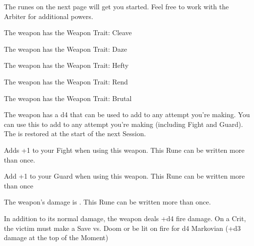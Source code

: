 {{  


}
 
The runes on the next page will get you started.  Feel free to work with the Arbiter for additional powers.  

\newpage




The weapon has the Weapon Trait: Cleave


The weapon has the Weapon Trait: Daze


The weapon has the Weapon Trait: Hefty


The weapon has the Weapon Trait: Rend


The weapon has the Weapon Trait: Brutal


The weapon has a d4 \UD that can be used to add to any \RO attempt you're making. You can use this \UD to add to any \RO attempt you're making (including Fight and Guard).  The \UD is restored at the start of the next Session.





Adds +1 to your Fight \RO when using this weapon.  This Rune can be written more than once.



Add +1 to your Guard \RO when using this weapon.  This Rune can be written more than once



The weapon's damage is \DCUP.  This Rune can be written more than once.



In addition to its normal damage, the weapon deals +d4 fire damage.  On a Crit, the victim must make a Save vs. Doom or be lit on fire for d4 Markovian (+d3 damage at the top of the Moment)

}
